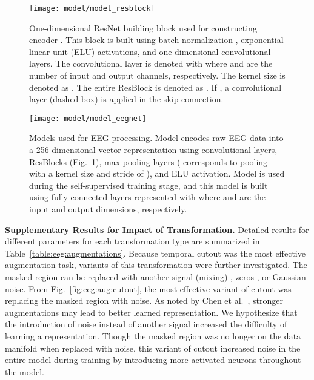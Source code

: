 \documentclass{article}
\renewcommand{\paragraph}[1]{\textbf{#1}\hspace{1em}}
\begin{document}
\begin{figure}[H]
  \centering
  \texttt{[image: model/model\_resblock]}
  \caption{One-dimensional ResNet \cite{he_identity_2016} building block used
  for constructing encoder . This block is built using batch normalization
  \cite{ioffe_batch_2015}, exponential linear unit (ELU) activations, and
  one-dimensional convolutional layers. The convolutional layer is denoted with
   where  and  are the number of input and output
  channels, respectively. The kernel size is denoted as . The entire ResBlock
  is denoted as . If , a convolutional
  layer (dashed box) is applied in the skip connection.}
  \label{fig:model:resblock}
\end{figure}

\begin{figure}[H]
  \centering
  \texttt{[image: model/model\_eegnet]}
  \caption{Models used for EEG processing. Model  encodes raw EEG data into a
  256-dimensional vector representation using convolutional layers, ResBlocks
  (Fig.~\ref{fig:model:resblock}), max pooling layers ( corresponds
  to pooling with a kernel size and stride of ), and ELU activation. Model
   is used during the self-supervised training stage, and this model is built
  using fully connected layers represented with  where 
  and  are the input and output dimensions, respectively.}
  \label{fig:model:eeg}
\end{figure}


\paragraph{Supplementary Results for Impact of Transformation.}
Detailed results for different parameters for each transformation type are
summarized in Table~\ref{table:eeg:augmentations}. Because temporal cutout was
the most effective augmentation task, variants of this transformation were
further investigated. The masked region can be replaced with another signal
(mixing) \cite{yun_cutmix_2019}, zeros \cite{devries_improved_2017}, or Gaussian
noise. From Fig.~\ref{fig:eeg:aug:cutout}, the most effective variant of cutout
was replacing the masked region with noise.  As noted by Chen et
al.~\cite{chen_simple_2020}, stronger augmentations may lead to better learned
representation. We hypothesize that the introduction of noise instead of another
signal increased the difficulty of learning a representation. Though the masked
region was no longer on the data manifold when replaced with noise, this variant
of cutout increased noise in the entire model during training by introducing
more activated neurons throughout the model.
\end{document}
